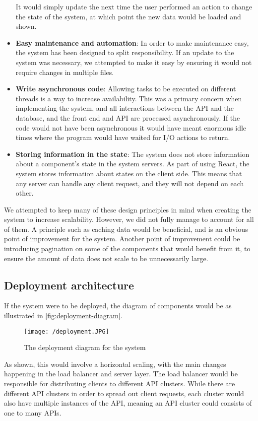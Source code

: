 \begin{itemize}
    It would simply update the next time the user performed an action to change the state of the system, at which point the new data would be loaded and shown.
    \item \textbf{Easy maintenance and automation}: In order to make maintenance easy, the system has been designed to split responsibility.
    If an update to the system was necessary, we attempted to make it easy by ensuring it would not require changes in multiple files.
    \item \textbf{Write asynchronous code}: Allowing tasks to be executed on different threads is a way to increase availability. 
    This was a primary concern when implementing the system, and all interactions between the API and the database, and the front end and API are processed asynchronously.
    If the code would not have been asynchronous it would have meant enormous idle times where the program would have waited for I/O actions to return.
    \item \textbf{Storing information in the state}: The system does not store information about a component's state in the system servers.
    As part of using React, the system stores information about states on the client side.
    This means that any server can handle any client request, and they will not depend on each other.
\end{itemize}
We attempted to keep many of these design principles in mind when creating the system to increase scalability.
However, we did not fully manage to account for all of them.
A principle such as caching data would be beneficial, and is an obvious point of improvement for the system.
Another point of improvement could be introducing pagination on some of the components that would benefit from it, to ensure the amount of data does not scale to be unnecessarily large.

\subsection{Deployment architecture}
If the system were to be deployed, the diagram of components would be as illustrated in \autoref{fig:deployment-diagram}.
\begin{figure}[H]
    \texttt{[image: /deployment.JPG]}
     \caption{The deployment diagram for the system}
     \label{fig:deployment-diagram}
 \end{figure}
 \noindent
As shown, this would involve a horizontal scaling, with the main changes happening in the load balancer and server layer.
The load balancer would be responsible for distributing clients to different API clusters.
While there are different API clusters in order to spread out client requests, each cluster would also have multiple instances of the API, meaning an API cluster could consists of one to many APIs.

